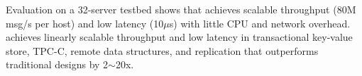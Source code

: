 Evaluation on a 32-server testbed shows that \sys achieves scalable throughput (80M msg/s per host) and low latency (10$\mu$s) with little CPU and network overhead.
\sys{} achieves linearly scalable throughput and low latency in transactional key-value store, TPC-C, remote data structures, and replication that outperforms traditional designs by 2$\sim$20x.







